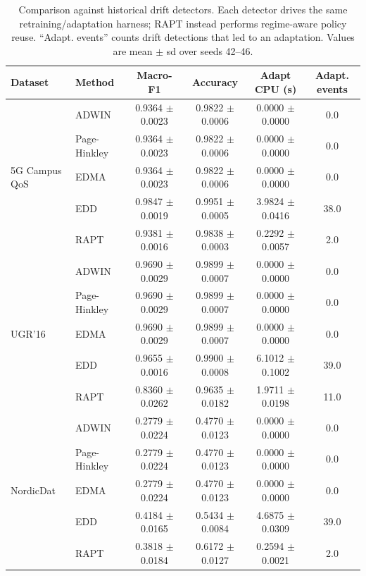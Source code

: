 \begin{table}[t]
\centering
\caption{Comparison against historical drift detectors. Each detector drives the
same retraining/adaptation harness; RAPT instead performs regime-aware policy
reuse. ``Adapt. events'' counts drift detections that led to an adaptation.
Values are mean $\pm$ sd over seeds 42--46.}
\label{tab:results_detectors}
\begin{tabular}{llcccc}
\toprule
Dataset & Method & Macro-F1 & Accuracy & Adapt CPU (s) & Adapt. events \\
\midrule
\multirow{5}{*}{5G Campus QoS}
 & ADWIN        & 0.9364 $\pm$ 0.0023 & 0.9822 $\pm$ 0.0006 & 0.0000 $\pm$ 0.0000 & 0.0  \\
 & Page-Hinkley & 0.9364 $\pm$ 0.0023 & 0.9822 $\pm$ 0.0006 & 0.0000 $\pm$ 0.0000 & 0.0  \\
 & EDMA         & 0.9364 $\pm$ 0.0023 & 0.9822 $\pm$ 0.0006 & 0.0000 $\pm$ 0.0000 & 0.0  \\
 & EDD          & 0.9847 $\pm$ 0.0019 & 0.9951 $\pm$ 0.0005 & 3.9824 $\pm$ 0.0416 & 38.0 \\
 & RAPT         & 0.9381 $\pm$ 0.0016 & 0.9838 $\pm$ 0.0003 & 0.2292 $\pm$ 0.0057 & 2.0  \\
\midrule
\multirow{5}{*}{UGR'16}
 & ADWIN        & 0.9690 $\pm$ 0.0029 & 0.9899 $\pm$ 0.0007 & 0.0000 $\pm$ 0.0000 & 0.0  \\
 & Page-Hinkley & 0.9690 $\pm$ 0.0029 & 0.9899 $\pm$ 0.0007 & 0.0000 $\pm$ 0.0000 & 0.0  \\
 & EDMA         & 0.9690 $\pm$ 0.0029 & 0.9899 $\pm$ 0.0007 & 0.0000 $\pm$ 0.0000 & 0.0  \\
 & EDD          & 0.9655 $\pm$ 0.0016 & 0.9900 $\pm$ 0.0008 & 6.1012 $\pm$ 0.1002 & 39.0 \\
 & RAPT         & 0.8360 $\pm$ 0.0262 & 0.9635 $\pm$ 0.0182 & 1.9711 $\pm$ 0.0198 & 11.0 \\
\midrule
\multirow{5}{*}{NordicDat}
 & ADWIN        & 0.2779 $\pm$ 0.0224 & 0.4770 $\pm$ 0.0123 & 0.0000 $\pm$ 0.0000 & 0.0  \\
 & Page-Hinkley & 0.2779 $\pm$ 0.0224 & 0.4770 $\pm$ 0.0123 & 0.0000 $\pm$ 0.0000 & 0.0  \\
 & EDMA         & 0.2779 $\pm$ 0.0224 & 0.4770 $\pm$ 0.0123 & 0.0000 $\pm$ 0.0000 & 0.0  \\
 & EDD          & 0.4184 $\pm$ 0.0165 & 0.5434 $\pm$ 0.0084 & 4.6875 $\pm$ 0.0309 & 39.0 \\
 & RAPT         & 0.3818 $\pm$ 0.0184 & 0.6172 $\pm$ 0.0127 & 0.2594 $\pm$ 0.0021 & 2.0  \\
\bottomrule
\end{tabular}
\end{table}
